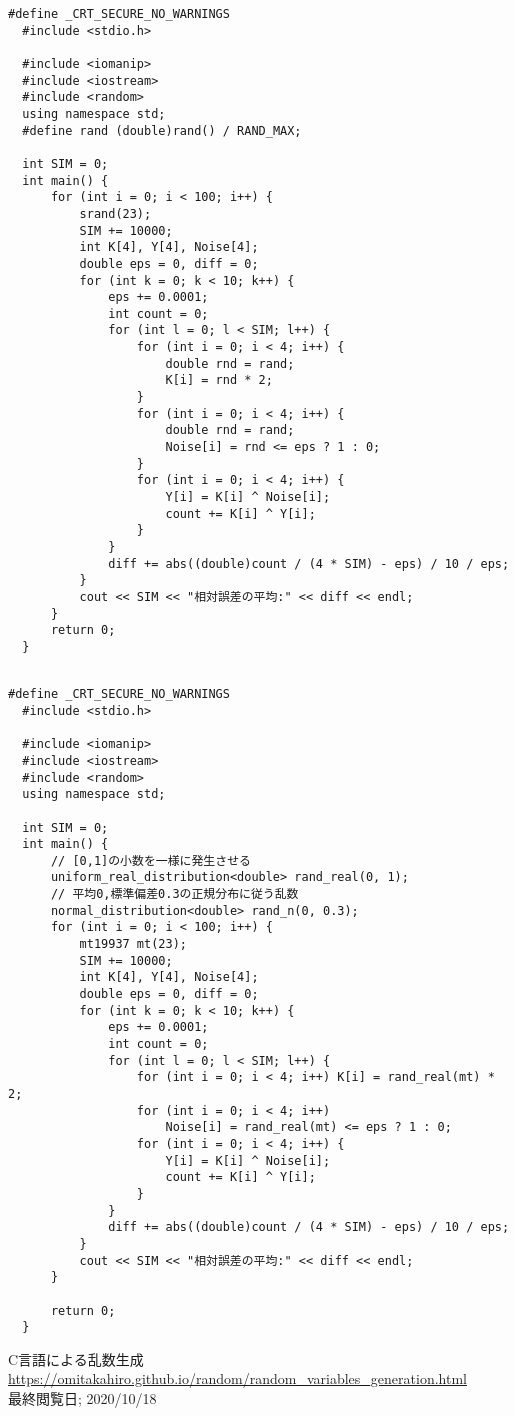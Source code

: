 \documentclass[12pt]{jarticle}
\begin{document}
\clearpage
\begin{lstlisting}[title=ソースコード3,label=kadai3]
  #define _CRT_SECURE_NO_WARNINGS
  #include <stdio.h>
  
  #include <iomanip>
  #include <iostream>
  #include <random>
  using namespace std;
  #define rand (double)rand() / RAND_MAX;
  
  int SIM = 0;
  int main() {
      for (int i = 0; i < 100; i++) {
          srand(23);
          SIM += 10000;
          int K[4], Y[4], Noise[4];
          double eps = 0, diff = 0;
          for (int k = 0; k < 10; k++) {
              eps += 0.0001;
              int count = 0;
              for (int l = 0; l < SIM; l++) {
                  for (int i = 0; i < 4; i++) {
                      double rnd = rand;
                      K[i] = rnd * 2;
                  }
                  for (int i = 0; i < 4; i++) {
                      double rnd = rand;
                      Noise[i] = rnd <= eps ? 1 : 0;
                  }
                  for (int i = 0; i < 4; i++) {
                      Y[i] = K[i] ^ Noise[i];
                      count += K[i] ^ Y[i];
                  }
              }
              diff += abs((double)count / (4 * SIM) - eps) / 10 / eps;
          }
          cout << SIM << "相対誤差の平均:" << diff << endl;
      }
      return 0;
  }
  
\end{lstlisting}
\clearpage
\begin{lstlisting}[title=ソースコード4,label=kadai4]
  #define _CRT_SECURE_NO_WARNINGS
  #include <stdio.h>
  
  #include <iomanip>
  #include <iostream>
  #include <random>
  using namespace std;
  
  int SIM = 0;
  int main() {
      // [0,1]の小数を一様に発生させる　    　　
      uniform_real_distribution<double> rand_real(0, 1);
      // 平均0,標準偏差0.3の正規分布に従う乱数
      normal_distribution<double> rand_n(0, 0.3);
      for (int i = 0; i < 100; i++) {
          mt19937 mt(23);
          SIM += 10000;
          int K[4], Y[4], Noise[4];
          double eps = 0, diff = 0;
          for (int k = 0; k < 10; k++) {
              eps += 0.0001;
              int count = 0;
              for (int l = 0; l < SIM; l++) {
                  for (int i = 0; i < 4; i++) K[i] = rand_real(mt) * 2;
                  for (int i = 0; i < 4; i++)
                      Noise[i] = rand_real(mt) <= eps ? 1 : 0;
                  for (int i = 0; i < 4; i++) {
                      Y[i] = K[i] ^ Noise[i];
                      count += K[i] ^ Y[i];
                  }
              }
              diff += abs((double)count / (4 * SIM) - eps) / 10 / eps;
          }
          cout << SIM << "相対誤差の平均:" << diff << endl;
      }
  
      return 0;
  }
\end{lstlisting}
\begin{thebibliography}{99}
    \label{sannkoubunnkenn_chapter}
    \bibitem{} C言語による乱数生成\\
    \url{https://omitakahiro.github.io/random/random_variables_generation.html}\\
    最終閲覧日; 2020/10/18
\end{thebibliography}

\end{document}
